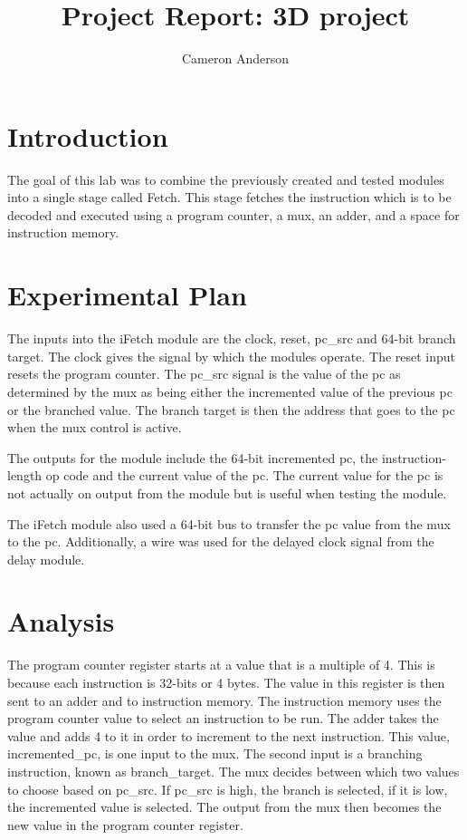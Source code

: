 \documentclass{article}
\author{Cameron Anderson}
\title{Project Report: 3D project}
\begin{document}
\maketitle

\section{Introduction}
The goal of this lab was to combine the previously created and tested modules into a single stage called Fetch. This stage fetches the instruction which is to be decoded and executed using a program counter, a mux, an adder, and a space for instruction memory.

\section{Experimental Plan}
The inputs into the iFetch module are the clock, reset, pc\_src and 64-bit branch target. The clock gives the signal by which the modules operate. The reset input resets the program counter. The pc\_src signal is the value of the pc as determined by the mux as being either the incremented value of the previous pc or the branched value.  The branch target is then the address that goes to the pc when the mux control is active.
     
The outputs for the module include the 64-bit incremented pc, the instruction-length op code and the current value of the pc. The current value for the pc is not actually on output from the module but is useful when testing the module. 

The iFetch module also used a 64-bit bus to transfer the pc value from the mux to the pc. Additionally, a wire was used for the delayed clock signal from the delay module.

\section{Analysis}
The program counter register starts at a value that is a multiple of 4. This is because each instruction is 32-bits or 4 bytes. The value in this register is then sent to an adder and to instruction memory. The instruction memory uses the program counter value to select an instruction to be run. The adder takes the value and adds 4 to it in order to increment to the next instruction. This value, incremented\_pc, is one input to the mux. The second input is a branching instruction, known as branch\_target. The mux decides between which two values to choose based on pc\_src. If pc\_src is high, the branch is selected, if it is low, the incremented value is selected. The output from the mux then becomes the new value in the program counter register. 
\end{document}
